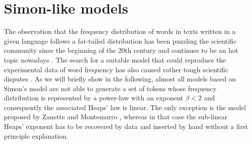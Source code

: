 \documentclass[graybox]{svmult}
\begin{document}
\section{Simon-like models}
\label{sec:vito_simon}
The observation that the frequency distribution of words in texts written in a given language follows a fat-tailed distribution has been puzzling the scientific community since the beginning of the 20th century \cite{estoup16,condon28,zipf35} and continues to be an hot topic nowadays \cite{ramon2010}.
The search for a suitable model that could reproduce the  experimental data of word frequency has also caused rather tough scientific disputes \cite{simon-mandel-dispute}.
As we will briefly show in the following, almost all models based on Simon's model are not able to generate a set of tokens whose frequency distribution is represented by a power-law with an exponent $\beta<2$ and consequently the associated Heaps' law is linear.
The only exception is the model proposed by Zanette and Montemurro \cite{zanette2005}, whereas in that case the sub-linear Heaps' exponent has to be recovered by data and inserted by hand  without a first principle explanation.
\end{document}

